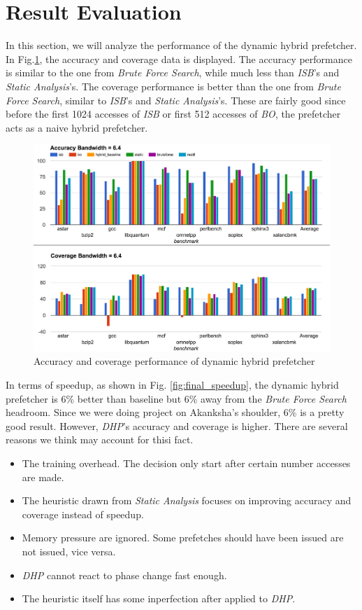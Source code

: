 \section{Result Evaluation}
\label{sec:result}
In this section, we will analyze the performance of the dynamic hybrid prefetcher. In Fig.\ref{fig:final_acc_cov}, the accuracy and coverage data is displayed. The accuracy performance is similar to the one from \emph{Brute Force Search}, while much less than \emph{ISB}'s and \emph{Static Analysis}'s. The coverage performance is better than the one from \emph{Brute Force Search}, similar to \emph{ISB}'s and \emph{Static Analysis}'s. These are fairly good since before the first 1024 accesses of \emph{ISB} or first 512 accesses of \emph{BO}, the prefetcher acts as a naive hybrid prefetcher.

\begin{figure}[ht!]
   \centering
   \includegraphics[width=1.0\textwidth]{images/final_acc_cov.png}
   \caption{Accuracy and coverage performance of dynamic hybrid prefetcher}
   \label{fig:final_acc_cov}
\end{figure}

In terms of speedup, as shown in Fig. \ref{fig:final_speedup}, the dynamic hybrid prefetcher is 6\% better than baseline but 6\% away from the \emph{Brute Force Search} headroom. Since we were doing project on Akanksha's shoulder, 6\% is a pretty good result. However, \emph{DHP}'s accuracy and coverage is higher. There are several reasons we think may account for thisi fact.
\begin{itemize}
  \item The training overhead. The decision only start after certain number accesses are made.
  \item The heuristic drawn from \emph{Static Analysis} focuses on improving accuracy and coverage instead of speedup.
  \item Memory pressure are ignored. Some prefetches should have been issued are not issued, vice versa.
  \item \emph{DHP} cannot react to phase change fast enough.
  \item The heuristic itself has some inperfection after applied to \emph{DHP}.
\end{itemize}

